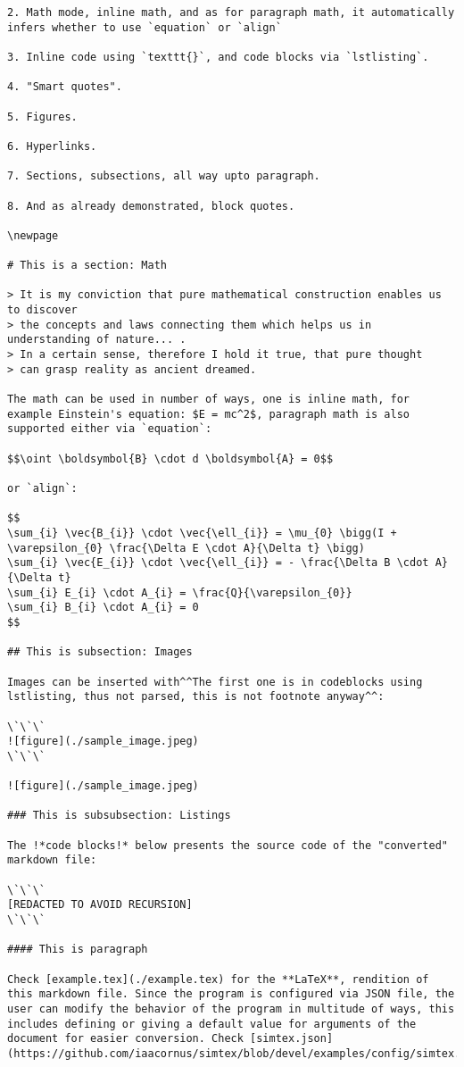 \documentclass[12pt, UTF8]{article}
\begin{document}
\begin{lstlisting}
2. Math mode, inline math, and as for paragraph math, it automatically infers whether to use `equation` or `align`

3. Inline code using `texttt{}`, and code blocks via `lstlisting`.

4. "Smart quotes".

5. Figures.

6. Hyperlinks.

7. Sections, subsections, all way upto paragraph.

8. And as already demonstrated, block quotes.

\newpage

# This is a section: Math

> It is my conviction that pure mathematical construction enables us to discover
> the concepts and laws connecting them which helps us in understanding of nature... .
> In a certain sense, therefore I hold it true, that pure thought
> can grasp reality as ancient dreamed.

The math can be used in number of ways, one is inline math, for example Einstein's equation: $E = mc^2$, paragraph math is also supported either via `equation`:

$$\oint \boldsymbol{B} \cdot d \boldsymbol{A} = 0$$

or `align`:

$$
\sum_{i} \vec{B_{i}} \cdot \vec{\ell_{i}} = \mu_{0} \bigg(I + \varepsilon_{0} \frac{\Delta E \cdot A}{\Delta t} \bigg)
\sum_{i} \vec{E_{i}} \cdot \vec{\ell_{i}} = - \frac{\Delta B \cdot A}{\Delta t}
\sum_{i} E_{i} \cdot A_{i} = \frac{Q}{\varepsilon_{0}}
\sum_{i} B_{i} \cdot A_{i} = 0
$$

## This is subsection: Images

Images can be inserted with^^The first one is in codeblocks using lstlisting, thus not parsed, this is not footnote anyway^^:

\`\`\`
![figure](./sample_image.jpeg)
\`\`\`

![figure](./sample_image.jpeg)

### This is subsubsection: Listings

The !*code blocks!* below presents the source code of the "converted" markdown file:

\`\`\`
[REDACTED TO AVOID RECURSION]
\`\`\`

#### This is paragraph

Check [example.tex](./example.tex) for the **LaTeX**, rendition of this markdown file. Since the program is configured via JSON file, the user can modify the behavior of the program in multitude of ways, this includes defining or giving a default value for arguments of the document for easier conversion. Check [simtex.json](https://github.com/iaacornus/simtex/blob/devel/examples/config/simtex.json).

\end{lstlisting}
	
\end{document}
